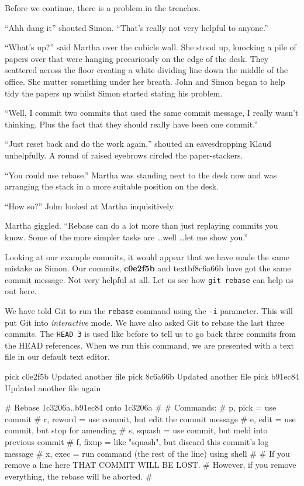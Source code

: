 Before we continue, there is a problem in the trenches.

\begin{trenches}
``Ahh dang it'' shouted Simon.
``That's really not very helpful to anyone.''

``What's up?'' said Martha over the cubicle wall.
She stood up, knocking a pile of papers over that were hanging precariously on the edge of the desk.
They scattered across the floor creating a white dividing line down the middle of the office.
She mutter something under her breath.
John and Simon began to help tidy the papers up whilst Simon started stating his problem.

``Well, I commit two commits that used the same commit message, I really wasn't thinking. Plus the fact that they should really have been one commit.''

``Just reset back and do the work again,'' shouted an eavesdropping Klaud unhelpfully.
A round of raised eyebrows circled the paper-stackers.

``You could use rebase.'' Martha was standing next to the desk now and was arranging the stack in a more suitable position on the desk.

``How so?'' John looked at Martha inquisitively.

Martha giggled.
``Rebase can do a lot more than just replaying commits you know. Some of the more simpler tasks are \ldots well \ldots let me show you.''
\end{trenches}

Looking at our example commits, it would appear that we have made the same mistake as Simon.
Our commits, \textbf{c0e2f5b} and textbf{8c6a66b} have got the same commit message.
Not very helpful at all.
Let us see how \texttt{git rebase} can help us out here.


We have told Git to run the \texttt{rebase} command using the \texttt{-i} parameter.
This will put Git into \emph{interactive} mode.
We have also asked Git to rebase the last three commits.
The \texttt{HEAD~3} is used like before to tell us to go back three commits from the HEAD references.
When we run this command, we are presented with a text file in our default text editor.

\begin{code}
pick c0e2f5b Updated another file
pick 8c6a66b Updated another file
pick b91ec84 Updated another file again

# Rebase 1c3206a..b91ec84 onto 1c3206a
#
# Commands:
#  p, pick = use commit
#  r, reword = use commit, but edit the commit message
#  e, edit = use commit, but stop for amending
#  s, squash = use commit, but meld into previous commit
#  f, fixup = like "squash", but discard this commit's log message
#  x, exec = run command (the rest of the line) using shell
#
# If you remove a line here THAT COMMIT WILL BE LOST.
# However, if you remove everything, the rebase will be aborted.
#
\end{code}

